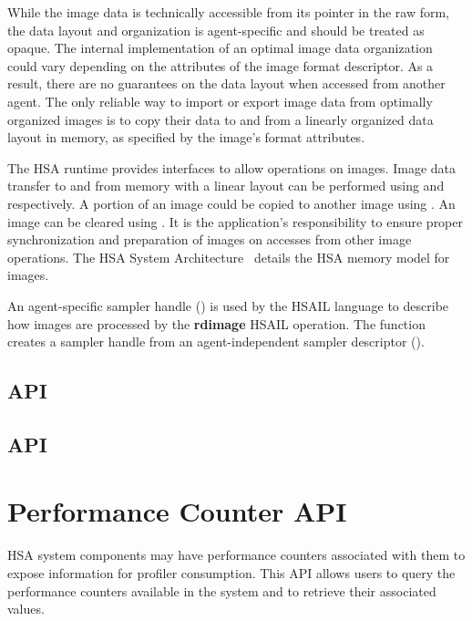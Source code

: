 \documentclass[oneside]{book}
\newcommand{\reffun}[1]{\textbf{#1}}
\newcommand{\refhsl}[1]{\reffun{#1}}
\begin{document}
While the image data is technically accessible from its pointer in the raw form,
the data layout and organization is agent-specific and should be treated as
opaque. The internal implementation of an optimal image data organization could
vary depending on the attributes of the image format descriptor. As a result,
there are no guarantees on the data layout when accessed from another agent. The
only reliable way to import or export image data from optimally organized images
is to copy their data to and from a linearly organized data layout in memory, as
specified by the image's format attributes.

The HSA runtime provides interfaces to allow operations on images. Image data
transfer to and from memory with a linear layout can be performed using
 and  respectively. A
portion of an image could be copied to another image using
. An image can be cleared using
. It is the application's responsibility to ensure
proper synchronization and preparation of images on accesses from other image
operations. The HSA System Architecture~\cite{sar} details the HSA memory
model for images.

An agent-specific sampler handle () is used by the
HSAIL language to describe how images are processed by the \refhsl{rdimage}
HSAIL operation. The function  creates a sampler
handle from an agent-independent sampler descriptor
().

\subsection{API}


\subsection{API}


\section{Performance Counter API}\label{sec:perfcount}
HSA system components may have performance counters associated with them to expose information for profiler consumption. This API allows users to query the performance counters available in the system and to retrieve their associated values.
\end{document}
